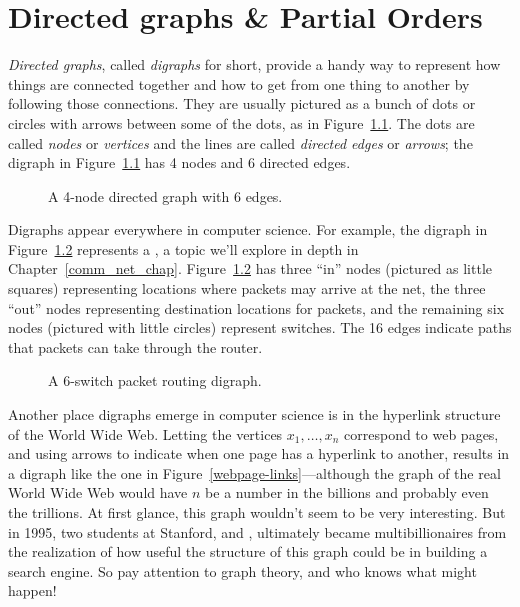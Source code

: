 \chapter{Directed graphs \& Partial Orders}\label{digraphs_chap}

\emph{Directed graphs},%
called \emph{digraphs}%
for short, provide a handy way to represent how things are connected together and how to
get from one thing to another by following those connections.  They are
usually pictured as a bunch of dots or circles with arrows between
some of the dots, as in Figure~\ref{fig:4N6E}.  The dots are called
\emph{nodes} or \emph{vertices} and the lines are called
\emph{directed edges} or \emph{arrows}; the digraph in
Figure~\ref{fig:4N6E} has 4 nodes and 6 directed edges.

\begin{figure}


\caption{A 4-node directed graph with 6 edges.}

\label{fig:4N6E}

\end{figure}

Digraphs appear everywhere in computer science.  For example, the
digraph in Figure~\ref{fig:6switchnet} represents a , a topic we'll explore in depth in Chapter~\ref{comm_net_chap}.
Figure~\ref{fig:6switchnet} has three ``in'' nodes (pictured as little
squares) representing locations where packets may arrive at the net,
the three ``out'' nodes representing destination locations for
packets, and the remaining six nodes (pictured with little circles)
represent switches.  The 16 edges indicate paths that packets can take
through the router.

\begin{figure}


\caption{A 6-switch packet routing digraph.}

\label{fig:6switchnet}
\end{figure}

Another place digraphs emerge in computer science is in the hyperlink
structure of the World Wide Web.  Letting the vertices $x_1, \dots,
x_n$ correspond to web pages, and using arrows to indicate when one
page has a hyperlink to another, results in a digraph like the one in
Figure~\ref{webpage-links}---although the graph of the real World Wide
Web would have $n$ be a number in the billions and probably even the
trillions.  At first glance, this graph wouldn't seem to be very
interesting.  But in 1995, two students at Stanford,  and , ultimately
became multibillionaires from the realization of how useful the
structure of this graph could be in building a search engine.  So pay
attention to graph theory, and who knows what might happen!

